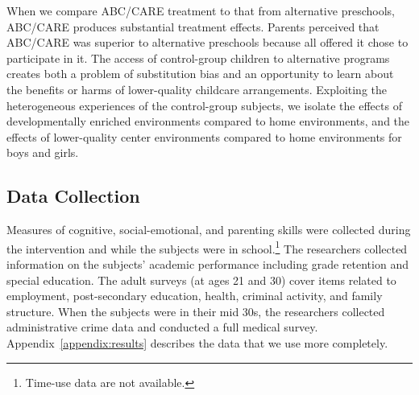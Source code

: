 When we compare ABC/CARE treatment to that from alternative preschools, ABC/CARE produces substantial treatment effects. Parents perceived that ABC/CARE was superior to alternative preschools because all offered it chose to participate in it. The access of control-group children to alternative programs creates both a problem of substitution bias and an opportunity to learn about the benefits or harms of lower-quality childcare arrangements. Exploiting the heterogeneous experiences of the control-group subjects, we isolate the effects of developmentally enriched environments compared to home environments, and the effects of  lower-quality center environments compared to home environments for boys and girls.

\subsection{Data Collection}

Measures of cognitive, social-emotional, and parenting skills were collected during the intervention and while the subjects were in school.\footnote{Time-use data are not available.} The researchers collected information on the subjects' academic performance including grade retention and special education. The adult surveys (at ages 21 and 30) cover items related to employment, post-secondary education, health, criminal activity, and family structure. When the subjects were in their mid 30s, the researchers collected administrative crime data and conducted a full medical survey. Appendix~\ref{appendix:results} describes the data that we use more completely.


